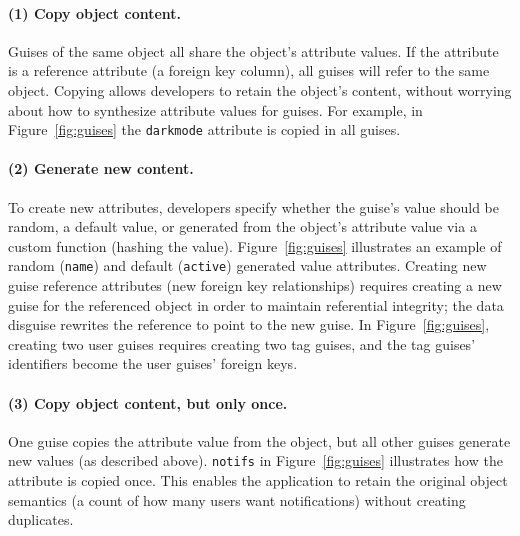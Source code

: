 \paragraph{(1) Copy object content.}
%
Guises of the same object all share the object's attribute values.
%
If the attribute is a reference attribute (\eg a foreign key column), all guises will refer to the same object.
%
%
Copying allows developers to retain the object's content, without worrying about how to
synthesize attribute values for guises.
%
For example, in Figure~\ref{fig:guises} the \texttt{darkmode} attribute is copied in
all guises.

\paragraph{(2) Generate new content.}
%
To create new attributes, developers specify whether the guise's value should be random,
a default value, or generated from the object's attribute value via a custom function (\eg hashing
the value).
%
Figure~\ref{fig:guises} illustrates an example of random (\texttt{name}) and default
(\texttt{active}) generated value attributes.
%
%
Creating new guise reference attributes (\eg new foreign key relationships) requires
creating a new guise for the referenced object in order to maintain referential
integrity;
the data disguise rewrites the reference to point to the new guise.
%
In Figure~\ref{fig:guises}, creating two user guises requires creating two
tag guises, and the tag guises' identifiers become the user guises' foreign keys.
%

\paragraph{(3) Copy object content, but only once.}
%
One guise copies the attribute value from the object, but all other guises generate new
values (as described above).
%
\texttt{notifs} in Figure~\ref{fig:guises} illustrates how the attribute is copied once.
%
This enables the application to retain the original object semantics (\eg a count of how many
users want notifications) without creating duplicates.
%



